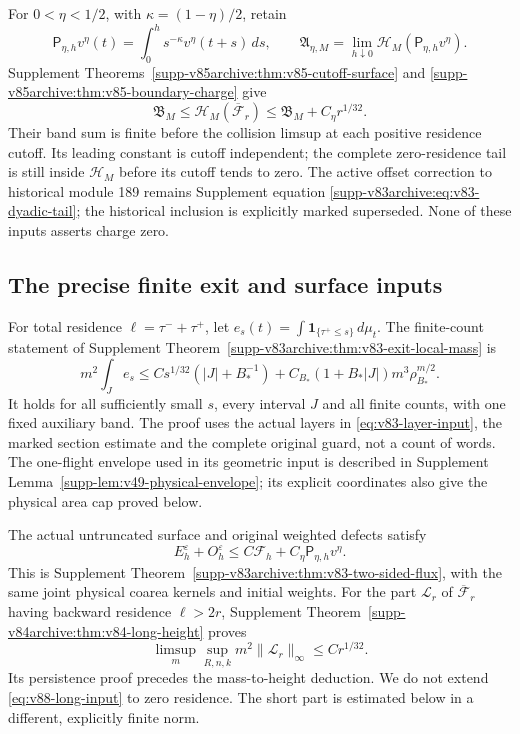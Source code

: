\documentclass[11pt,reqno]{amsart}
\numberwithin{equation}{section}
\theoremstyle{definition}
\theoremstyle{remark}\newtheorem{remark}[theorem]{Remark}
\newcommand{\one}{\mathbf1}\newcommand{\dd}{\,\mathrm d}
\begin{document}
For $0<\eta<1/2$, with $\kappa=(1-\eta)/2$, retain
\[
 \mathsf P_{\eta,h}v^\eta(t)=\int_0^h s^{-\kappa}v^\eta(t+s)\,ds,
 \qquad\mathfrak A_{\eta,M}
       =\lim_{h\downarrow0}\mathcal H_M(\mathsf P_{\eta,h}v^\eta).
\]
Supplement Theorems~\ref{supp-v85archive:thm:v85-cutoff-surface}
and \ref{supp-v85archive:thm:v85-boundary-charge} give
\begin{equation}\label{eq:v86-surface-input}
 \mathfrak B_M\le\mathcal H_M(\overline{\mathcal F}_r)
                         \le\mathfrak B_M+C_\eta r^{1/32}.
\end{equation}
Their band sum is finite before the collision limsup at each positive
residence cutoff. Its leading constant is cutoff independent; the
complete zero-residence tail is still inside $\mathcal H_M$ before
its cutoff tends to zero. The active offset correction to historical
module 189 remains Supplement equation
\eqref{supp-v83archive:eq:v83-dyadic-tail}; the historical inclusion is
explicitly marked superseded. None of these inputs asserts charge zero.


\subsection{The precise finite exit and surface inputs}
For total residence $\ell=\tau^-+\tau^+$, let
$e_s(t)=\int\one_{\{\tau^+\le s\}}\,d\mu_t$.
The finite-count statement of Supplement
Theorem~\ref{supp-v83archive:thm:v83-exit-local-mass} is
\begin{equation}\label{eq:v88-exit-input}
 m^2\int_J e_s\le C s^{1/32}(|J|+B_*^{-1})
       +C_{B_*}(1+B_*|J|)m^3\rho_{B_*}^{m/2}.
\end{equation}
It holds for all sufficiently small $s$, every interval $J$ and all
finite counts, with one fixed auxiliary band. The proof uses the
actual layers in \eqref{eq:v83-layer-input}, the marked section
estimate and the complete original guard, not a count of words.
The one-flight envelope used in its geometric input is described in
Supplement Lemma~\ref{supp-lem:v49-physical-envelope}; its explicit
coordinates also give the physical area cap proved below.

The actual untruncated surface and original weighted defects satisfy
\begin{equation}\label{eq:v88-optical-input}
 E_h^\varepsilon+O_h^\varepsilon
     \le C\mathcal F_h+C_\eta\mathsf P_{\eta,h}v^\eta.
\end{equation}
This is Supplement Theorem~\ref{supp-v83archive:thm:v83-two-sided-flux},
with the same joint physical coarea kernels and initial weights.
For the part $\mathcal L_r$ of $\overline{\mathcal F}_r$ having
backward residence $\ell>2r$, Supplement
Theorem~\ref{supp-v84archive:thm:v84-long-height} proves
\begin{equation}\label{eq:v88-long-input}
 \limsup_m\sup_{R,n,k}m^2\|\mathcal L_r\|_\infty\le Cr^{1/32}.
\end{equation}
Its persistence proof precedes the mass-to-height deduction. We do
not extend \eqref{eq:v88-long-input} to zero residence. The short
part is estimated below in a different, explicitly finite norm.
\end{document}
